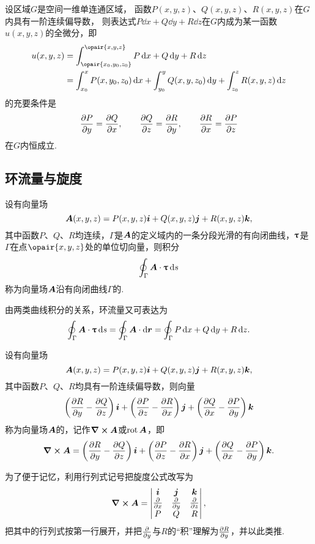 \begin{theorem}
设区域\(G\)是空间一维单连通区域，%
函数\(P(x,y,z)\)、\(Q(x,y,z)\)、\(R(x,y,z)\)在\(G\)内具有一阶连续偏导数，%
则表达式\(P\dd{x}+Q\dd{y}+R\dd{z}\)在\(G\)内成为某一函数\(u(x,y,z)\)的全微分，即\begin{align*}
u(x,y,z)
&= \int_{\opair{x_0,y_0,z_0}}^{\opair{x,y,z}}
 P\dd{x}+Q\dd{y}+R\dd{z} \\
&= \int_{x_0}^x P(x,y_0,z_0) \dd{x}
+ \int_{y_0}^y Q(x,y,z_0) \dd{y}
+ \int_{z_0}^z R(x,y,z) \dd{z}
\end{align*}的充要条件是\[
\pdv{P}{y}=\pdv{Q}{x}, \qquad
\pdv{Q}{z}=\pdv{R}{y}, \qquad
\pdv{R}{x}=\pdv{P}{z}
\]在\(G\)内恒成立.
\end{theorem}

\subsection{环流量与旋度}
\begin{definition}
设有向量场\[
\boldsymbol{A}(x,y,z)=P(x,y,z)\boldsymbol{i}+Q(x,y,z)\boldsymbol{j}+R(x,y,z)\boldsymbol{k},
\]其中函数\(P\)、\(Q\)、\(R\)均连续，\(\Gamma\)是\(\boldsymbol{A}\)的定义域内的一条分段光滑的有向闭曲线，\(\boldsymbol{\uptau}\)是\(\Gamma\)在点\(\opair{x,y,z}\)处的单位切向量，则积分\[
\oint_{\Gamma}{\boldsymbol{A}\cdot\boldsymbol{\uptau}\dd{s}}
\]称为向量场\(\boldsymbol{A}\)沿有向闭曲线\(\Gamma\)的.
\end{definition}
由两类曲线积分的关系，环流量又可表达为\[
\oint_{\Gamma}{\boldsymbol{A}\cdot\boldsymbol{\uptau}\dd{s}}
=\oint_{\Gamma}{\boldsymbol{A}\cdot\dd{\boldsymbol{r}}}
=\oint_{\Gamma}{P\dd{x}+Q\dd{y}+R\dd{z}}.
\]

\begin{definition}
设有向量场\[
\boldsymbol{A}(x,y,z)=P(x,y,z)\boldsymbol{i}+Q(x,y,z)\boldsymbol{j}+R(x,y,z)\boldsymbol{k},
\]其中函数\(P\)、\(Q\)、\(R\)均具有一阶连续偏导数，则向量\[
\left( \pdv{R}{y} - \pdv{Q}{z} \right)\boldsymbol{i}
+\left( \pdv{P}{z} - \pdv{R}{x} \right)\boldsymbol{j}
+\left( \pdv{Q}{x} - \pdv{P}{y} \right)\boldsymbol{k}
\]称为向量场\(\boldsymbol{A}\)的，记作\(\curl{\boldsymbol{A}}\)或\(\operatorname{rot}\boldsymbol{A}\)，即\[
\curl{\boldsymbol{A}}
=\left( \pdv{R}{y} - \pdv{Q}{z} \right)\boldsymbol{i}
+\left( \pdv{P}{z} - \pdv{R}{x} \right)\boldsymbol{j}
+\left( \pdv{Q}{x} - \pdv{P}{y} \right)\boldsymbol{k}.
\]
\end{definition}

为了便于记忆，利用行列式记号把旋度公式改写为\[
\curl{\boldsymbol{A}}
=\begin{vmatrix}
\boldsymbol{i} & \boldsymbol{j} & \boldsymbol{k} \\
\pdv{x} & \pdv{y} & \pdv{z} \\
P & Q & R \\
\end{vmatrix},
\]把其中的行列式按第一行展开，并把\(\pdv{y}\)与\(R\)的“积”理解为\(\pdv{R}{y}\)，并以此类推.

